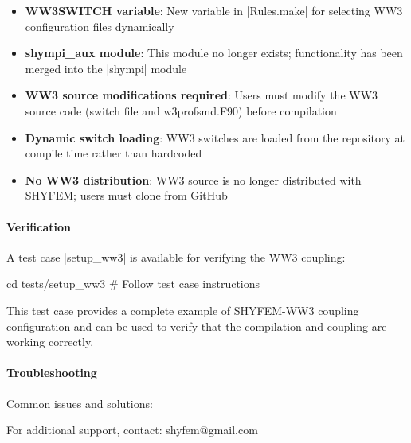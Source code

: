 \begin{itemize}
\item \textbf{WW3SWITCH variable}: New variable in |Rules.make| for selecting
WW3 configuration files dynamically
\item \textbf{shympi\_aux module}: This module no longer exists; functionality
has been merged into the |shympi| module
\item \textbf{WW3 source modifications required}: Users must modify the WW3
source code (switch file and w3profsmd.F90) before compilation
\item \textbf{Dynamic switch loading}: WW3 switches are loaded from the
repository at compile time rather than hardcoded
\item \textbf{No WW3 distribution}: WW3 source is no longer distributed with
SHYFEM; users must clone from GitHub
\end{itemize}

\paragraph{Verification}

A test case |setup_ww3| is available for verifying the WW3 coupling:
\begin{code}
cd tests/setup_ww3
# Follow test case instructions
\end{code}

This test case provides a complete example of SHYFEM-WW3 coupling configuration
and can be used to verify that the compilation and coupling are working correctly.

\paragraph{Troubleshooting}

Common issues and solutions:


For additional support, contact: shyfem@gmail.com
